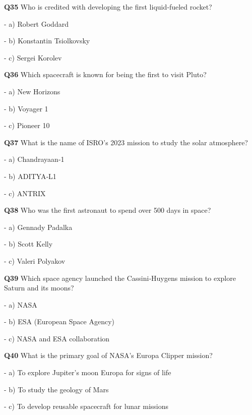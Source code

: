 \textbf{Q35} Who is credited with developing the first liquid‑fueled rocket?\par
\quad - a) Robert Goddard\par
\quad - b) Konstantin Tsiolkovsky\par
\quad - c) Sergei Korolev\par

\textbf{Q36} Which spacecraft is known for being the first to visit Pluto?\par
\quad - a) New Horizons\par
\quad - b) Voyager 1\par
\quad - c) Pioneer 10\par

\textbf{Q37} What is the name of ISRO's 2023 mission to study the solar atmosphere?\par
\quad - a) Chandrayaan‑1\par
\quad - b) ADITYA‑L1\par
\quad - c) ANTRIX\par

\textbf{Q38} Who was the first astronaut to spend over 500 days in space?\par
\quad - a) Gennady Padalka\par
\quad - b) Scott Kelly\par
\quad - c) Valeri Polyakov\par

\textbf{Q39} Which space agency launched the Cassini‑Huygens mission to explore Saturn and its moons?\par
\quad - a) NASA\par
\quad - b) ESA (European Space Agency)\par
\quad - c) NASA and ESA collaboration\par

\textbf{Q40} What is the primary goal of NASA's Europa Clipper mission?\par
\quad - a) To explore Jupiter's moon Europa for signs of life\par
\quad - b) To study the geology of Mars\par
\quad - c) To develop reusable spacecraft for lunar missions\par